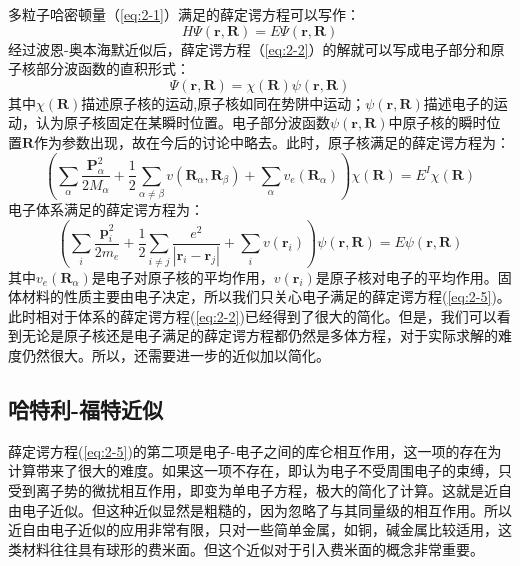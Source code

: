 多粒子哈密顿量（\ref{eq:2-1}）满足的薛定谔方程可以写作：
\begin{equation}
    \label{eq:2-2}
    H \Psi(\mathbf{r}, \mathbf{R})=E \Psi(\mathbf{r}, \mathbf{R})
\end{equation}
经过波恩-奥本海默近似后，薛定谔方程（\ref{eq:2-2}）的解就可以写成电子部分和原子核部分波函数的直积形式：
\begin{equation}
    \label{eq:2-3}
    \Psi(\mathbf{r}, \mathbf{R})=\chi(\mathbf{R}) \psi(\mathbf{r}, \mathbf{R})
\end{equation}
其中$\chi(\mathbf{R})$描述原子核的运动,原子核如同在势阱中运动；$\psi(\mathbf{r}, \mathbf{R})$描述电子的运动，认为原子核固定在某瞬时位置\citep{solid}。电子部分波函数$\psi(\mathbf{r}, \mathbf{R})$中原子核的瞬时位置$\mathbf{R}$作为参数出现，故在今后的讨论中略去。此时，原子核满足的薛定谔方程为：
\begin{equation}
    \label{eq:2-4}
    \left(\sum_{\alpha} \frac{\mathbf{P}_{\alpha}^{2}}{2 M_{\alpha}}+\frac{1}{2} \sum_{\alpha \neq \beta} v\left(\mathbf{R}_{\alpha}, \mathbf{R}_{\beta}\right)+\sum_{\alpha} v_{e}\left(\mathbf{R}_{\alpha}\right)\right)\chi(\mathbf{R})=E^I \chi(\mathbf{R})
\end{equation}
电子体系满足的薛定谔方程为：
\begin{equation}
    \label{eq:2-5}
    \left(\sum_{i} \frac{\mathbf{p}_{i}^{2}}{2 m_{e}}+\frac{1}{2} \sum_{i \neq j} \frac{e^{2}}{\left|\mathbf{r}_{i}-\mathbf{r}_{j}\right|}+\sum_{i} v\left(\mathbf{r}_{i}\right)\right)\psi(\mathbf{r}, \mathbf{R})=E\psi(\mathbf{r}, \mathbf{R})
\end{equation}
其中$v_{e}\left(\mathbf{R}_{\alpha}\right)$是电子对原子核的平均作用，$v\left(\mathbf{r}_{i}\right)$是原子核对电子的平均作用。固体材料的性质主要由电子决定，所以我们只关心电子满足的薛定谔方程(\ref{eq:2-5})。此时相对于体系的薛定谔方程(\ref{eq:2-2})已经得到了很大的简化。但是，我们可以看到无论是原子核还是电子满足的薛定谔方程都仍然是多体方程，对于实际求解的难度仍然很大。所以，还需要进一步的近似加以简化。

\subsection{哈特利-福特近似}
薛定谔方程(\ref{eq:2-5})的第二项是电子-电子之间的库仑相互作用，这一项的存在为计算带来了很大的难度。如果这一项不存在，即认为电子不受周围电子的束缚，只受到离子势的微扰相互作用，即变为单电子方程，极大的简化了计算。这就是近自由电子近似。但这种近似显然是粗糙的，因为忽略了与其同量级的相互作用。所以近自由电子近似的应用非常有限，只对一些简单金属，如铜，碱金属比较适用，这类材料往往具有球形的费米面。但这个近似对于引入费米面的概念非常重要。

